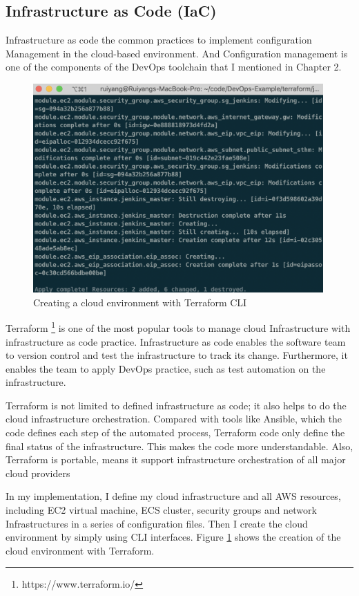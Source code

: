\subsection{Infrastructure as Code (IaC)}
Infrastructure as code the common practices to implement configuration Management in the cloud-based environment. And Configuration management is one of the components of the DevOps toolchain that I mentioned in Chapter 2.
\begin{figure}[h]
\centering
\includegraphics[width=0.99\textwidth]{pics/terraform.png}
\caption{Creating a cloud environment with Terraform CLI}
\label{fig:terraform}
\end{figure}
\par
Terraform \footnote{https://www.terraform.io/} is one of the most popular tools to manage cloud Infrastructure with infrastructure as code practice. Infrastructure as code enables the software team to version control and test the infrastructure to track its change. Furthermore, it enables the team to apply DevOps practice, such as test automation on the infrastructure.

Terraform is not limited to defined infrastructure as code; it also helps to do the cloud infrastructure orchestration. Compared with tools like Ansible, which the code defines each step of the automated process, Terraform code only define the final status of the infrastructure. This makes the code more understandable. Also, Terraform is portable, means it support infrastructure orchestration of all major cloud providers

In my implementation, I define my cloud infrastructure and all AWS resources, including EC2 virtual machine, ECS cluster, security groups and network Infrastructures in a series of configuration files. Then I create the cloud environment by simply using CLI interfaces. Figure \ref{fig:terraform} shows the creation of the cloud environment with Terraform.
